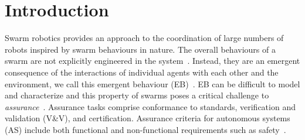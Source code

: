 \documentclass[runningheads]{llncs}
\begin{document}
\section{Introduction}\label{introduction}
Swarm robotics provides an approach to the coordination of large numbers of robots inspired by swarm behaviours in nature. %
The overall behaviours of a swarm are not explicitly engineered in the system~\cite{Winfield2006,Abeywickrama2022}. 
Instead, they are an emergent consequence of the interactions of individual agents with each other and the environment, we call this emergent behaviour (EB)~\cite{Abeywickrama2022}. 
EB can be difficult to model and characterize and this property of swarms poses a critical challenge to \emph{assurance}~\cite{Cheng2014}. 
Assurance tasks comprise conformance to standards, verification and validation (V\&V), and certification. Assurance criteria for autonomous systems (AS) include both functional and non-functional requirements such as safety~\cite{Cheng2014}. 
\end{document}
